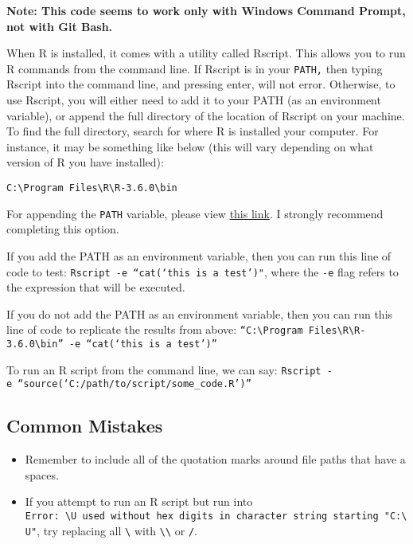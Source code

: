 \documentclass[
]{book}
\providecommand{\tightlist}{%
  \setlength{\itemsep}{0pt}\setlength{\parskip}{0pt}}
\begin{document}
\textbf{Note: This code seems to work only with Windows Command Prompt, not with Git Bash.}

When R is installed, it comes with a utility called Rscript. This allows you to run R commands from the command line. If Rscript is in your \texttt{PATH,} then typing Rscript into the command line, and pressing enter, will not error. Otherwise, to use Rscript, you will either need to add it to your PATH (as an environment variable), or append the full directory of the location of Rscript on your machine. To find the full directory, search for where R is installed your computer. For instance, it may be something like below (this will vary depending on what version of R you have installed):

\texttt{C:\textbackslash{}Program\ Files\textbackslash{}R\textbackslash{}R-3.6.0\textbackslash{}bin}

For appending the \texttt{PATH} variable, please view \href{https://www.howtogeek.com/118594/how-to-edit-your-system-path-for-easy-command-line-access/}{this link}. I strongly recommend completing this option.

If you add the PATH as an environment variable, then you can run this line of code to test:
\texttt{Rscript\ -e\ “cat(‘this\ is\ a\ test’)"}, where the \texttt{-e} flag refers to the expression that will be executed.

If you do not add the PATH as an environment variable, then you can run this line of code to replicate the results from above:
\texttt{“C:\textbackslash{}Program\ Files\textbackslash{}R\textbackslash{}R-3.6.0\textbackslash{}bin”\ -e\ “cat(‘this\ is\ a\ test’)”}

To run an R script from the command line, we can say:
\texttt{Rscript\ -e\ “source(‘C:/path/to/script/some\_code.R’)”}

\hypertarget{common-mistakes}{%
\subsection{Common Mistakes}\label{common-mistakes}}

\begin{itemize}
\tightlist
\item
  Remember to include all of the quotation marks around file paths that have a spaces.
\item
  If you attempt to run an R script but run into \texttt{Error:\ \textquotesingle{}\textbackslash{}U\textquotesingle{}\ used\ without\ hex\ digits\ in\ character\ string\ starting\ "\textquotesingle{}C:\textbackslash{}U"}, try replacing all \texttt{\textbackslash{}} with \texttt{\textbackslash{}\textbackslash{}} or \texttt{/}.
\end{itemize}
\end{document}
